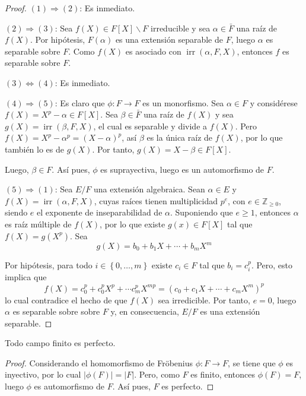 \documentclass[12pt]{report}
\theoremstyle{largebreak}
\newcommand\cf[3]{\ensuremath{#1:#2\rightarrow#3}}
\DeclareMathOperator{\irr}{irr}
\begin{document}
    \begin{proof}
        $(1)\Rightarrow(2)$: Es inmediato.
        
        $(2)\Rightarrow(3)$: Sea $f(X)\in F[X]\backslash F$ irreducible y sea $\alpha\in\bar{F}$ una raíz de $f(X)$. Por hipótesis, $F(\alpha)$ es una extensión separable de $F$, luego $\alpha$ es separable sobre $F$. Como $f(X)$ es asociado con $\irr(\alpha, F, X)$, entonces $f$ es separable sobre $F$.

        $(3)\iff(4)$: Es inmediato.

        $(4)\Rightarrow(5)$: Es claro que $\cf{\phi}{F}{F}$ es un monorfismo. Sea $\alpha\in F$ y considérese $f(X)=X^p-\alpha\in F[X]$. Sea $\beta\in\bar{F}$ una raíz de $f(X)$ y sea $g(X)=\irr(\beta,F,X)$, el cual es separable y divide a $f(X)$. Pero $f(X)=X^p-\alpha^p=(X-\alpha)^p$, así $\beta$ es la única raíz de $f(X)$, por lo que también lo es de $g(X)$. Por tanto, $g(X)=X-\beta\in F[X]$.

        Luego, $\beta\in F$. Así pues, $\phi$ es suprayectiva, luego es un automorfismo de $F$.

        $(5)\Rightarrow(1)$: Sea $E/F$ una extensión algebraica. Sean $\alpha\in E$ y $f(X)=\irr(\alpha, F, X)$, cuyas raíces tienen multiplicidad $p^e$, con $e\in\mathbb{Z}_{\geq0}$, siendo $e$ el exponente de inseparabilidad de $\alpha$. Suponiendo que $e\geq1$, entonces $\alpha$ es raíz múltiple de $f(X)$, por lo que existe $g(x)\in F[X]$ tal que $f(X)=g(X^p)$. Sea
        \begin{equation*}
            g(X)=b_0+b_1X+\cdots+b_mX^m
        \end{equation*}
        
        Por hipótesis, para todo $i\in\left\{0,\dots,m\right\}$ existe $c_i\in F$ tal que $b_i=c_i^p$. Pero, esto implica que
        \begin{equation*}
            f(X)=c_0^p+c_0^pX^p+\cdots c_m^pX^{mp}=\left(c_0+c_1X+\cdots+c_mX^m\right)^p
        \end{equation*}
        lo cual contradice el hecho de que $f(X)$ sea irredicible. Por tanto, $e=0$, luego $\alpha$ es separable sobre sobre $F$ y, en consecuencia, $E/F$ es una extensión separable.
    \end{proof}

    \begin{theor}
        Todo campo finito es perfecto.
    \end{theor}

    \begin{proof}
        Considerando el homomorfismo de Fröbenius $\cf{\phi}{F}{F}$, se tiene que $\phi$ es inyectivo, por lo cual $\big| \phi(F) \big| = \big| F\big|$. Pero, como $F$ es finito, entonces $\phi(F)=F$, luego $\phi$ es automorfismo de $F$. Así pues, $F$ es perfecto.
    \end{proof}
\end{document}

